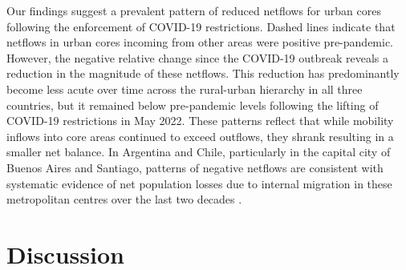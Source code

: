 \documentclass[fleqn,10pt]{wlscirep}
\providecommand{\DIFdelbegin}{} %
\providecommand{\DIFdelend}{} %
\begin{document}
Our findings suggest a prevalent pattern of reduced netflows for urban cores following the enforcement of COVID-19 restrictions. Dashed lines indicate that netflows in urban cores incoming from other areas were positive pre-pandemic. However, the negative relative change since the COVID-19 outbreak reveals a reduction in the magnitude of these netflows. This reduction has predominantly become less acute over time across the rural-urban hierarchy in all three countries, but it remained below pre-pandemic levels following the lifting of COVID-19 restrictions in May 2022. These patterns reflect that while mobility inflows into core areas continued to exceed outflows, they shrank resulting in a smaller net balance. In Argentina and Chile, particularly in the capital city of Buenos Aires and Santiago, patterns of negative netflows are consistent with systematic evidence of net population losses due to internal migration in these metropolitan centres over the last two decades \cite{rowe2013spatial, vignoli2019efectos, rodriguez2022migracion}.


\DIFdelbegin %


\DIFdelend \section*{Discussion}
\end{document}
